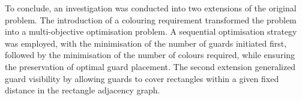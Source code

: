 \documentclass{report}
\begin{document}
To conclude, an investigation was conducted into two extensions of the original problem. The introduction of a colouring requirement transformed the problem into a multi-objective optimisation problem. A sequential optimisation strategy was employed, with the minimisation of the number of guards initiated first, followed by the minimisation of the number of colours required, while ensuring the preservation of optimal guard placement. The second extension generalized guard visibility by allowing guards to cover rectangles within a given fixed distance in the rectangle adjacency graph.

\end{document}
